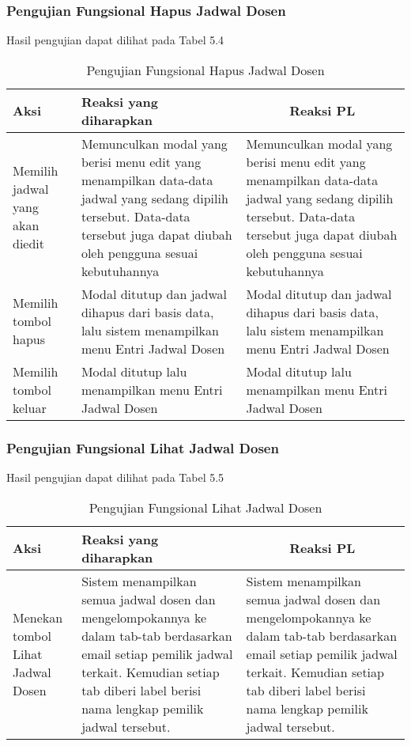 \subsubsection{Pengujian Fungsional Hapus Jadwal Dosen}
Hasil pengujian dapat dilihat pada Tabel 5.4
\begin{center}
	\begin{table}[H]
		\caption{Pengujian Fungsional Hapus Jadwal Dosen}
		\begin{tabular}{|p{5cm}|p{5cm}|p{5cm}|}
		\hline
		\centering Aksi	& 	\centering Reaksi yang diharapkan &  \multicolumn{1}{c|}{Reaksi PL} \\
		\hline
		Memilih jadwal yang akan diedit & Memunculkan modal yang berisi menu edit yang menampilkan data-data jadwal yang sedang dipilih tersebut. Data-data tersebut juga dapat diubah oleh pengguna sesuai kebutuhannya & Memunculkan modal yang berisi menu edit yang menampilkan data-data jadwal yang sedang dipilih tersebut. Data-data tersebut juga dapat diubah oleh pengguna sesuai kebutuhannya \\
		\hline
		Memilih tombol hapus & Modal ditutup dan jadwal dihapus dari basis data, lalu sistem menampilkan menu Entri Jadwal Dosen & Modal ditutup dan jadwal dihapus dari basis data, lalu sistem menampilkan menu Entri Jadwal Dosen \\
		\hline
		Memilih tombol keluar & Modal ditutup lalu menampilkan menu Entri Jadwal Dosen & Modal ditutup lalu menampilkan menu Entri Jadwal Dosen \\
		\hline
		\end{tabular}
	\end{table}
\end{center}

\subsubsection{Pengujian Fungsional Lihat Jadwal Dosen}
Hasil pengujian dapat dilihat pada Tabel 5.5
\begin{center}
	\begin{table}[H]
		\caption{Pengujian Fungsional Lihat Jadwal Dosen}
		\begin{tabular}{|p{5cm}|p{5cm}|p{5cm}|}
		\hline
		\centering Aksi	& 	\centering Reaksi yang diharapkan &  \multicolumn{1}{c|}{Reaksi PL} \\
		\hline
		Menekan tombol Lihat Jadwal Dosen & 
		Sistem menampilkan semua jadwal dosen dan mengelompokannya ke dalam tab-tab berdasarkan email setiap pemilik jadwal terkait. Kemudian setiap tab diberi label berisi nama lengkap pemilik jadwal tersebut. &
		Sistem menampilkan semua jadwal dosen dan mengelompokannya ke dalam tab-tab berdasarkan email setiap pemilik jadwal terkait. Kemudian setiap tab diberi label berisi nama lengkap pemilik jadwal tersebut.\\
		\hline
		\end{tabular}
	\end{table}
\end{center}

